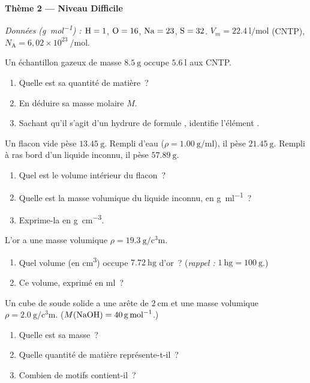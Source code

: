 \documentclass[11pt,a4paper]{article}
\begin{document}
\begin{center}{\large\bfseries\color{primarydark} Thème 2 — Niveau Difficile}\end{center}
\emph{Données (\si{\gram\per\mole}) :} $\ce{H}=1$, $\ce{O}=16$, $\ce{Na}=23$, $\ce{S}=32$.
\quad $V_m = \SI{22.4}{\litre\per\mole}$ (CNTP), $N_{\mathrm{A}} = 6{,}02\times10^{23}\ \si{\per\mole}$.

\begin{exo}
Un échantillon gazeux de masse $\SI{8.5}{\gram}$ occupe $\SI{5.6}{\litre}$ aux CNTP.
\begin{enumerate}[label=\alph*)]
  \item Quelle est sa quantité de matière~?
  \item En déduire sa masse molaire $M$.
  \item Sachant qu'il s'agit d'un hydrure de formule , identifie l'élément .
\end{enumerate}
\end{exo}

\begin{exo}
Un flacon vide pèse $\SI{13.45}{\gram}$. Rempli d'eau ($\rho = \SI{1.00}{\gram\per\milli\litre}$),
il pèse $\SI{21.45}{\gram}$. Rempli à ras bord d'un liquide inconnu, il pèse $\SI{57.89}{\gram}$.
\begin{enumerate}[label=\alph*)]
  \item Quel est le volume intérieur du flacon~?
  \item Quelle est la masse volumique du liquide inconnu, en \si{\gram\per\milli\litre}~?
  \item Exprime-la en \si{\gram\per\cubic\centi\metre}.
\end{enumerate}
\end{exo}

\begin{exo}
L'or a une masse volumique $\rho = \SI{19.3}{\gram\per\cubic\centi\metre}$.
\begin{enumerate}[label=\alph*)]
  \item Quel volume (en \si{\cubic\centi\metre}) occupe $\SI{7.72}{\hecto\gram}$ d'or~?
        (\emph{rappel :} $\SI{1}{\hecto\gram} = \SI{100}{\gram}$.)
  \item Ce volume, exprimé en \si{\milli\litre}~?
\end{enumerate}
\end{exo}

\begin{exo}
Un cube de soude  solide a une arête de $\SI{2}{\centi\metre}$ et une masse volumique
$\rho = \SI{2.0}{\gram\per\cubic\centi\metre}$. ($M(\ce{NaOH}) = \SI{40}{\gram\per\mole}$.)
\begin{enumerate}[label=\alph*)]
  \item Quelle est sa masse~?
  \item Quelle quantité de matière représente-t-il~?
  \item Combien de motifs  contient-il~?
\end{enumerate}
\end{exo}
\end{document}
